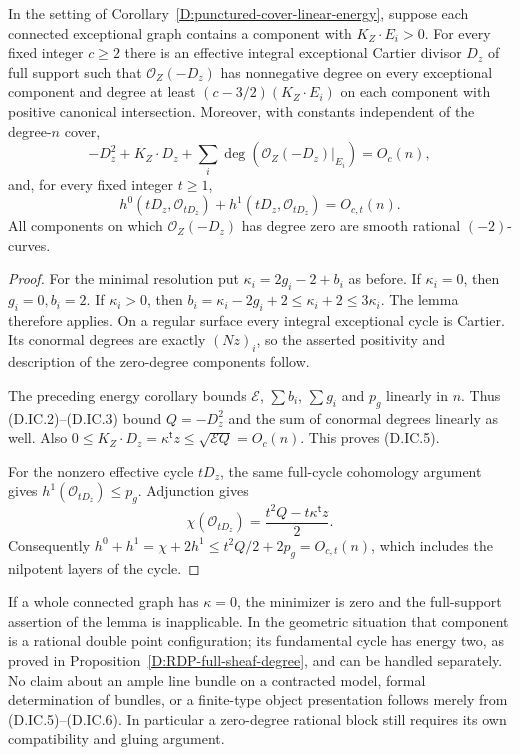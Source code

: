 \begin{corollary}
\label{D:punctured-cover-antinef-cycle}
In the setting of Corollary~\ref{D:punctured-cover-linear-energy},
suppose each connected exceptional graph contains a component with
$K_Z\cdot E_i>0$. For every fixed integer $c\ge2$ there is an
effective integral exceptional Cartier divisor $D_z$ of full support
such that $\mathcal O_Z(-D_z)$ has nonnegative degree on every
exceptional component and degree at least
$(c-3/2)(K_Z\cdot E_i)$ on each component with positive canonical
intersection. Moreover, with constants independent of the degree-$n$
cover,
\[
 -D_z^2+K_Z\cdot D_z+
       \sum_i\deg(\mathcal O_Z(-D_z)|_{E_i})=O_c(n),     \tag{D.IC.5}
\]
and, for every fixed integer $t\ge1$,
\[
 h^0(tD_z,\mathcal O_{tD_z})+
 h^1(tD_z,\mathcal O_{tD_z})=O_{c,t}(n).                \tag{D.IC.6}
\]
All components on which $\mathcal O_Z(-D_z)$ has degree zero are
smooth rational $(-2)$-curves.
\end{corollary}
\begin{proof}
For the minimal resolution put $\kappa_i=2g_i-2+b_i$ as before.
If $\kappa_i=0$, then $g_i=0,b_i=2$. If $\kappa_i>0$,
then $b_i=\kappa_i-2g_i+2\le\kappa_i+2\le3\kappa_i$.
The lemma therefore applies. On a regular surface every integral
exceptional cycle is Cartier. Its conormal degrees are exactly
$(Nz)_i$, so the asserted positivity and description of the
zero-degree components follow.

The preceding energy corollary bounds
$\mathcal E$, $\sum b_i$, $\sum g_i$ and $p_g$ linearly in $n$.
Thus (D.IC.2)--(D.IC.3) bound $Q=-D_z^2$ and the sum of
conormal degrees linearly as well. Also
$0\le K_Z\cdot D_z=\kappa^{\mathsf t}z
\le\sqrt{\mathcal E Q}=O_c(n)$. This proves (D.IC.5).

For the nonzero effective cycle $tD_z$, the same full-cycle
cohomology argument gives $h^1(\mathcal O_{tD_z})\le p_g$.
Adjunction gives
\[
 \chi(\mathcal O_{tD_z})
       =\frac{t^2Q-t\kappa^{\mathsf t}z}{2}.
\]
Consequently
$h^0+h^1=\chi+2h^1\le t^2Q/2+2p_g=O_{c,t}(n)$,
which includes the nilpotent layers of the cycle.
\end{proof}

\begin{remark}
If a whole connected graph has $\kappa=0$, the minimizer is zero
and the full-support assertion of the lemma is inapplicable.
In the geometric situation that component is a rational double
point configuration; its fundamental cycle has energy two, as
proved in Proposition~\ref{D:RDP-full-sheaf-degree}, and can be
handled separately. No claim about an ample line bundle on a
contracted model, formal determination of bundles, or a finite-type
object presentation follows merely from (D.IC.5)--(D.IC.6).
In particular a zero-degree rational block still requires its
own compatibility and gluing argument.
\end{remark}
